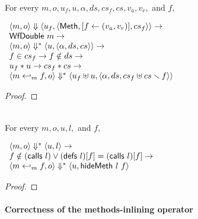 \begin{lemma}
  \label{lem-inlinedmm-meth2}
  \mbox{}\\
  For every $m, o, u_f, u, \alpha, ds, cs_f, cs, v_a, v_r,$ and $f,$
  \begin{center}
    \begin{math}
      \begin{array}{l}
        \langle m, o \rangle \Downarrow \langle u_f, \langle \textsf{Meth},  [ f \leftarrow (v_a, v_r) ], cs_f \rangle \rangle \to \\
        \textsf{WfDouble}\ m \to \\
        \langle m, o \rangle \Downarrow^{\ast} \langle u, \langle \alpha, ds, cs \rangle \rangle \to \\
        f \in cs_f \to f \notin ds \to \\
        u_f \ast u \to cs_f \ast cs \to \\
        \langle m \hookleftarrow_{m}{} f, o \rangle \Downarrow^{\ast} \langle u_f \uplus u, \langle \alpha, ds, cs_f \uplus cs \smallsetminus{} f \rangle \rangle
      \end{array}
    \end{math}
  \end{center}
\end{lemma}
\begin{proof}
\end{proof}

\begin{lemma}
  \label{lem-inlinedmm}
  \mbox{}\\
  For every $m, o, u, l,$ and $f,$
  \begin{center}
    \begin{math}
      \begin{array}{l}
        \langle m, o \rangle \Downarrow^{\ast} \langle u, l \rangle \to \\
        f \notin (\textsf{calls}\ l) \vee (\textsf{defs}\ l)[f] = (\textsf{calls}\ l)[f] \to \\
        \langle m \hookleftarrow_{m}{} f, o \rangle \Downarrow^{\ast} \langle u, \textsf{hideMeth}{}\ l\ f \rangle
      \end{array}
    \end{math}
  \end{center}
\end{lemma}
\begin{proof}
\end{proof}

\paragraph{Correctness of the methods-inlining operator}

